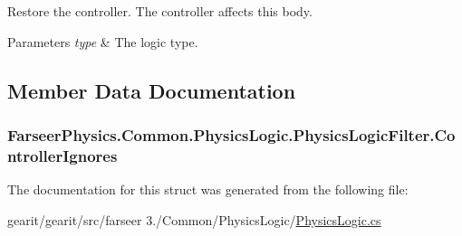 Restore the controller. The controller affects this body. 


\begin{DoxyParams}{Parameters}
{\em type} & The logic type.\\
\hline
\end{DoxyParams}


\subsection{Member Data Documentation}
\hypertarget{struct_farseer_physics_1_1_common_1_1_physics_logic_1_1_physics_logic_filter_a406a3471b6a489519d45dc0548987321}{
\subsubsection[{Controller\+Ignores}]{ Farseer\+Physics.\+Common.\+Physics\+Logic.\+Physics\+Logic\+Filter.\+Controller\+Ignores}}\label{struct_farseer_physics_1_1_common_1_1_physics_logic_1_1_physics_logic_filter_a406a3471b6a489519d45dc0548987321}


The documentation for this struct was generated from the following file\+:\begin{DoxyCompactItemize}
\item 
gearit/gearit/src/farseer 3./\+Common/\+Physics\+Logic/\hyperlink{_physics_logic_8cs}{Physics\+Logic.\+cs}\end{DoxyCompactItemize}

